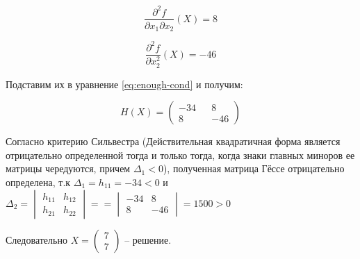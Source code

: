 \begin{equation*}
	\frac{\partial^2 f}{\partial x_1 \partial x_2}(X) = 8
\end{equation*}

\begin{equation*}
	\frac{\partial^2 f}{\partial x^2_2}(X) = - 46
\end{equation*}

Подставим их в уравнение \ref{eq:enough-cond} и получим:

\begin{equation*}
	H(X) = 
	\begin{pmatrix}
		-34 && 8
		\\
		8 && -46
	\end{pmatrix}
\end{equation*}

Согласно критерию Сильвестра (Действительная квадратичная форма является отрицательно определенной тогда и только тогда, когда знаки главных миноров ее матрицы чередуются, причем $\Delta_1 < 0$), полученная матрица Гёссе отрицательно определена, т.к $\Delta_1 = h_{11} = -34 < 0$ и $\Delta_2 =%
\begin{vmatrix}%
	h_{11} & h_{12}%
	\\
	h_{21} & h_{22}
\end{vmatrix} =%
=
\begin{vmatrix}%
	-34 & 8%
	\\
	8 & -46
\end{vmatrix} =1500 > 0$

Следовательно $X = \begin{pmatrix}
	7
	\\
	7
\end{pmatrix}$ -- решение.

